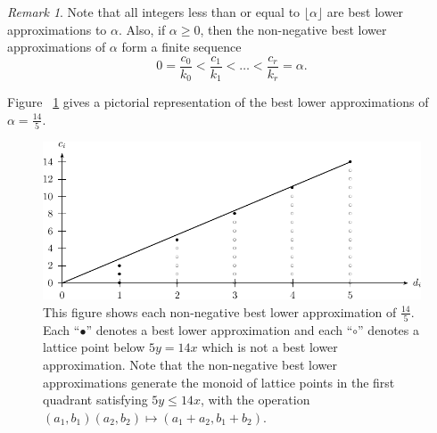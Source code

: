 \documentclass{amsart}
\theoremstyle{plain}
\theoremstyle{definition}
\theoremstyle{remark}
\newtheorem{rem}[thm]{Remark}
\numberwithin{equation}{section}
\begin{document}
\begin{rem}
\label{rem:lower-approximation}
Note that all integers less than or equal to $\lfloor \alpha \rfloor$
are best lower approximations to $\alpha$. Also, if $\alpha \ge 0$,
then the non-negative best lower approximations of
$\alpha$ form a finite sequence
\[
	0 = \frac{c_0}{k_0} < \frac{c_1}{k_1} < \ldots < \frac{c_r}{k_r} = \alpha.
\]

\noindent
Figure ~\ref{fig:s14/5-lattice} gives a pictorial representation of the best lower approximations of $\alpha = \frac{14}{5}$.
\end{rem}

\begin{figure}
\includegraphics{pics/spin-lower-approximations-pic-pics.pdf}
\caption{This figure shows each non-negative best lower
approximation of $\frac{14}{5}.$ Each ``$\bullet$'' denotes a best
lower approximation and each ``$\circ$'' denotes a lattice point
below $5y=14x$ which is not a best lower approximation.  Note that
the non-negative best lower approximations generate the monoid of
lattice points in the first quadrant satisfying  $5y \le 14x$, with
the operation $(a_1, b_1)(a_2, b_2)\mapsto (a_1 + a_2, b_1 + b_2)$.}
\label{fig:s14/5-lattice}
\end{figure}
\end{document}
